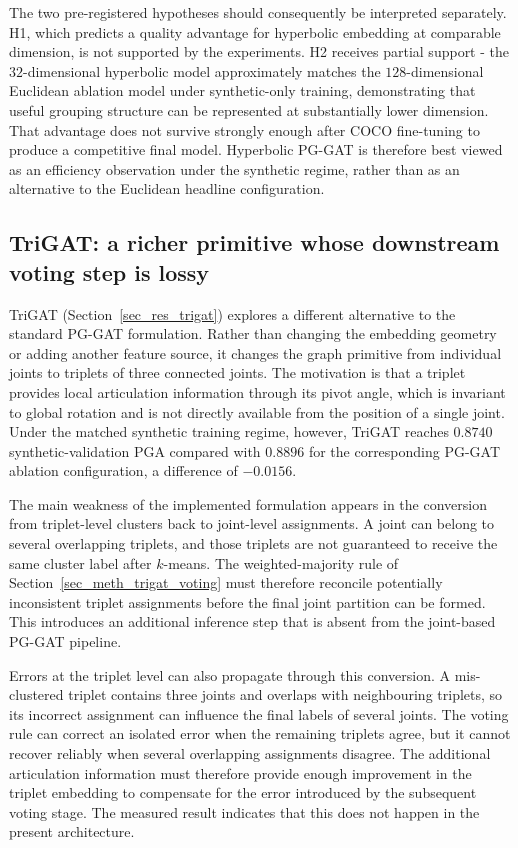 The two pre-registered hypotheses should consequently be interpreted
separately.
H1, which predicts a quality advantage for hyperbolic embedding at
comparable dimension, is not supported by the experiments.
H2 receives partial support -
the $32$-dimensional hyperbolic model approximately matches the
$128$-dimensional Euclidean ablation model under synthetic-only training,
demonstrating that useful grouping structure can be represented at
substantially lower dimension.
That advantage does not survive strongly enough after COCO fine-tuning
to produce a competitive final model.
Hyperbolic PG-GAT is therefore best viewed as an efficiency observation
under the synthetic regime,
rather than as an alternative to the Euclidean headline configuration.

\subsection{TriGAT: a richer primitive whose downstream voting step is lossy}
\label{sec_disc_transfer_trigat}

TriGAT (Section~\ref{sec_res_trigat}) explores a different alternative
to the standard PG-GAT formulation.
Rather than changing the embedding geometry or adding another feature
source, it changes the graph primitive from individual joints to
triplets of three connected joints.
The motivation is that a triplet provides local articulation information
through its pivot angle,
which is invariant to global rotation and is not directly available
from the position of a single joint.
Under the matched synthetic training regime, however,
TriGAT reaches $0.8740$ synthetic-validation PGA compared with $0.8896$
for the corresponding PG-GAT ablation configuration,
a difference of $-0.0156$.

The main weakness of the implemented formulation appears in the
conversion from triplet-level clusters back to joint-level assignments.
A joint can belong to several overlapping triplets,
and those triplets are not guaranteed to receive the same cluster label
after $k$-means.
The weighted-majority rule of Section~\ref{sec_meth_trigat_voting}
must therefore reconcile potentially inconsistent triplet assignments
before the final joint partition can be formed.
This introduces an additional inference step that is absent from the
joint-based PG-GAT pipeline.

Errors at the triplet level can also propagate through this conversion.
A mis-clustered triplet contains three joints and overlaps with
neighbouring triplets,
so its incorrect assignment can influence the final labels of several
joints.
The voting rule can correct an isolated error when the remaining
triplets agree,
but it cannot recover reliably when several overlapping assignments
disagree.
The additional articulation information must therefore provide enough
improvement in the triplet embedding to compensate for the error
introduced by the subsequent voting stage.
The measured result indicates that this does not happen in the present
architecture.

